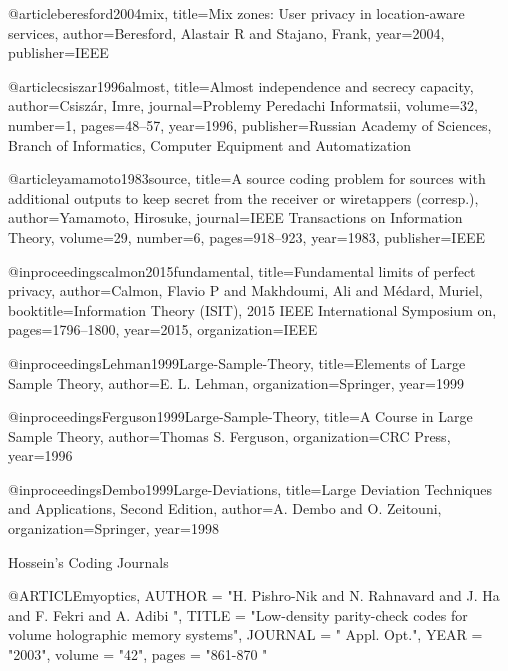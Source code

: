 {{{{@article{beresford2004mix,
	title={Mix zones: User privacy in location-aware services},
	author={Beresford, Alastair R and Stajano, Frank},
	year={2004},
	publisher={IEEE}
}


@article{csiszar1996almost,
	title={Almost independence and secrecy capacity},
	author={Csisz{\'a}r, Imre},
	journal={Problemy Peredachi Informatsii},
	volume={32},
	number={1},
	pages={48--57},
	year={1996},
	publisher={Russian Academy of Sciences, Branch of Informatics, Computer Equipment and Automatization}
}

@article{yamamoto1983source,
	title={A source coding problem for sources with additional outputs to keep secret from the receiver or wiretappers (corresp.)},
	author={Yamamoto, Hirosuke},
	journal={IEEE Transactions on Information Theory},
	volume={29},
	number={6},
	pages={918--923},
	year={1983},
	publisher={IEEE}
}


@inproceedings{calmon2015fundamental,
	title={Fundamental limits of perfect privacy},
	author={Calmon, Flavio P and Makhdoumi, Ali and M{\'e}dard, Muriel},
	booktitle={Information Theory (ISIT), 2015 IEEE International Symposium on},
	pages={1796--1800},
	year={2015},
	organization={IEEE}
}



@inproceedings{Lehman1999Large-Sample-Theory,
	title={Elements of Large Sample Theory},
	author={E. L. Lehman},
	organization={Springer},
	year={1999}
}


@inproceedings{Ferguson1999Large-Sample-Theory,
	title={A Course in Large Sample Theory},
	author={Thomas S. Ferguson},
	organization={CRC Press},
	year={1996}
}



@inproceedings{Dembo1999Large-Deviations,
	title={Large Deviation Techniques and Applications, Second Edition},
	author={A. Dembo and O. Zeitouni},
	organization={Springer},
	year={1998}
}


Hossein's Coding Journals

@ARTICLE{myoptics,
	AUTHOR =       "H. Pishro-Nik and N. Rahnavard and J. Ha and F. Fekri and A. Adibi ",
	TITLE =        "Low-density parity-check codes for volume holographic memory systems",
	JOURNAL =      " Appl. Opt.",
	YEAR =         "2003",
	volume =       "42",
	pages =        "861-870  "
}






}}}}
